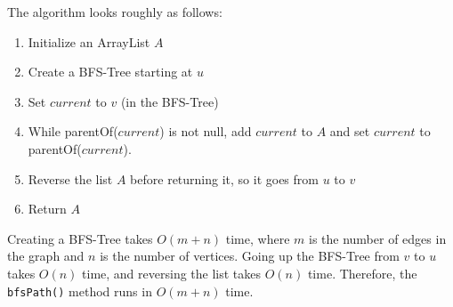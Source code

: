 \documentclass[12pt]{article}
\begin{document}
The algorithm looks roughly as follows:

\begin{enumerate}
\item Initialize an ArrayList $A$
\item Create a BFS-Tree starting at $u$
\item Set $current$ to $v$ (in the BFS-Tree)
\item While parentOf($current$) is not null, add $current$ to $A$
  and set $current$ to parentOf($current$).
\item Reverse the list $A$ before returning it, so it goes
  from $u$ to $v$
\item Return $A$
\end{enumerate}

\noindent
Creating a BFS-Tree takes $O(m + n)$ time, where $m$ is the number
of edges in the graph and $n$ is the number of vertices. Going up the
BFS-Tree from $v$ to $u$ takes $O(n)$ time, and reversing the list
takes $O(n)$ time. Therefore, the \lstinline|bfsPath()| method runs
in $O(m + n)$ time.
\end{document}

